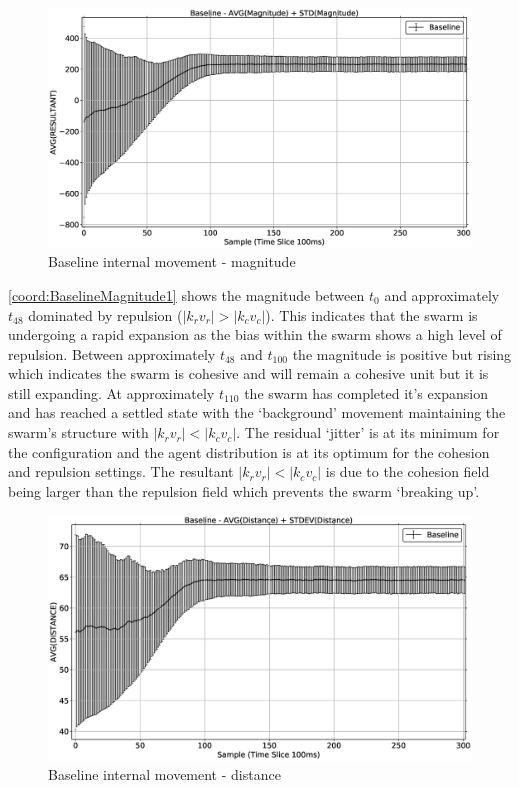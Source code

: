 \begin{figure}[H]
\begin{center}
\includegraphics[width=14cm]{CHAPTER-6/figures/BaselineMagnitude1}
\end{center}
\caption{Baseline internal movement - magnitude\label{coord:BaselineMagnitude1}}
\end{figure}

\autoref{coord:BaselineMagnitude1} shows the magnitude between $t_0$ and approximately $t_{48}$ dominated by repulsion ($|k_rv_r| > |k_cv_c|$). This indicates that the swarm is undergoing a rapid expansion as the bias within the swarm shows a high level of repulsion. Between approximately $t_{48}$ and $t_{100}$ the magnitude is positive but rising which indicates the swarm is cohesive and will remain a cohesive unit but it is still expanding. At approximately $t_{110}$ the swarm has completed it's expansion and has reached a settled state with the `background' movement maintaining the swarm's structure with $|k_rv_r| < |k_cv_c|$. The residual `jitter' is at its minimum for the configuration and the agent distribution is at its optimum for the cohesion and repulsion settings. The resultant $|k_rv_r| < |k_cv_c|$ is due to the cohesion field being larger than the repulsion field which prevents the swarm `breaking up'. 

\begin{figure}[H]
\begin{center}
\includegraphics[width=14cm]{CHAPTER-6/figures/BaselineDistance1}
\end{center}
\caption{Baseline internal movement - distance\label{coord:BaselineDistance1}}
\end{figure}

